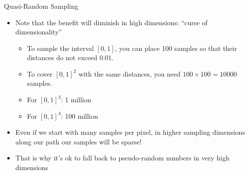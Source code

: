 \documentclass[utf8,stillsansserifmath,fleqn,t]{beamer}
\begin{document}
\begin{frame}[label=curse-of-dim]
\frametitle{\insertsection}
Quasi-Random Sampling
\begin{itemize}
\item Note that the benefit will diminish in high dimensions: ``curse of dimensionality''
    \begin{itemize}
    \item To sample the interval $[0,1]$, you can place 100 samples so that their distances
    do not exceed $0.01$.
    \item To cover $[0,1]^2$ with the same distances, you need $100\times100=10000$ samples.
    \item For $[0,1]^3$: 1 million
    \item For $[0,1]^4$: 100 million
    \end{itemize}
\item Even if we start with many samples per pixel, in higher sampling dimensions along our path
our samples will be sparse!
\item That is why it's ok to fall back to pseudo-random numbers in very high
dimensions
\end{itemize}
\end{frame}
\end{document}
